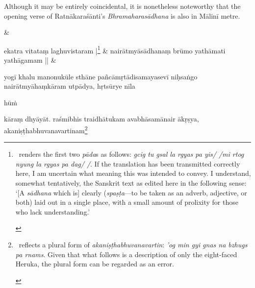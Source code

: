 \documentclass[naipra.tex]{subfiles}
\begin{document}
\begin{sanskrit}
{\begin{english}
	Although it may be entirely coincidental, it is nonetheless noteworthy that the opening verse of Ratnākaraśānti's \emph{Bhramaharasādhana} is also in Mālinī metre.
\end{english}} \&



\medskip\versequote
ekatra vitataṃ laghuvistaram |\footnote{\begin{english}
	\TIB\ renders the first two \emph{pāda}s as follows: \emph{gcig tu gsal la rgyas pa yis/ /mi rtog nyung la rgyas pa dag/ /}.
	If the translation has been transmitted correctly here, I am uncertain what meaning this was intended to convey. 
	I understand, somewhat tentatively, the Sanskrit text as edited here in the following sense: `[A \emph{sādhana} which is] clearly (\emph{spaṣṭa}—to be taken as an adverb, adjective, or both) laid out in a single place, with a small amount of prolixity for those who lack understanding.'
\end{english}} & 
nairātmyāsādhanaṃ brūmo yathāmati yathāgamam || \&


\medskip\pstart
yogī khalu  manonukūle sthāne pañcāmṛtādisamayasevī  niḥsaṅgo   nairātmyāhaṃkāram utpādya, hṛtsūrye nīla\dsh \begin{mantra}hūṁ\end{mantra}\dsh kāraṃ dhyāyāt. 
 raśmibhis traidhātukam avabhāsamānair ākṛṣya, akaniṣṭhabhuvanavartinam\footnote{\begin{english}
	\TIB\ reflects a plural form of \emph{akaniṣṭhabhuvanavartin}: \emph{'og min gyi gnas na bzhugs pa rnams}.
	Given that what follows is a description of only the eight-faced Heruka, the plural form can be regarded as an error.


\end{english}}
\end{sanskrit}
\end{document}
